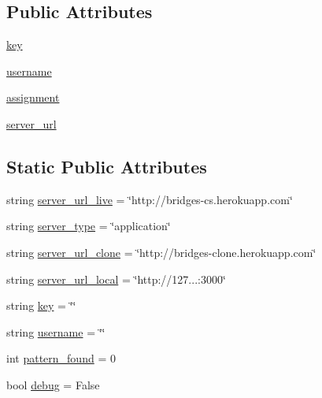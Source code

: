 \subsection*{Public Attributes}
\begin{DoxyCompactItemize}
\item 
\mbox{\hyperlink{classbridges_1_1connector_1_1_connector_afeae8bc992dfa4336a6cc766d8414e6f}{key}}
\item 
\mbox{\hyperlink{classbridges_1_1connector_1_1_connector_adeb8d1b493eae70c24127fb175e1bfe7}{username}}
\item 
\mbox{\hyperlink{classbridges_1_1connector_1_1_connector_a2df020c062b6224d4eeb2c5407c02656}{assignment}}
\item 
\mbox{\hyperlink{classbridges_1_1connector_1_1_connector_abcc06e345e43916cf975eb200187d911}{server\+\_\+url}}
\end{DoxyCompactItemize}
\subsection*{Static Public Attributes}
\begin{DoxyCompactItemize}
\item 
string \mbox{\hyperlink{classbridges_1_1connector_1_1_connector_a10c26bfaf2718f837e7bddfd7715b729}{server\+\_\+url\+\_\+live}} = \char`\"{}http\+://bridges-\/cs.\+herokuapp.\+com\char`\"{}
\item 
string \mbox{\hyperlink{classbridges_1_1connector_1_1_connector_ab5146d539819322f0b0e121a56356ba2}{server\+\_\+type}} = \char`\"{}application\char`\"{}
\item 
string \mbox{\hyperlink{classbridges_1_1connector_1_1_connector_a9048518314ac4902eda88f8457154b63}{server\+\_\+url\+\_\+clone}} = \char`\"{}http\+://bridges-\/clone.\+herokuapp.\+com\char`\"{}
\item 
string \mbox{\hyperlink{classbridges_1_1connector_1_1_connector_a7d58b50fbd7d10f805957ec620135ef7}{server\+\_\+url\+\_\+local}} = \char`\"{}http\+://127...\+:3000\char`\"{}
\item 
string \mbox{\hyperlink{classbridges_1_1connector_1_1_connector_a3b577c34402fea1910f56fd9cac51c07}{key}} = \char`\"{}\char`\"{}
\item 
string \mbox{\hyperlink{classbridges_1_1connector_1_1_connector_af2f4f996092cf63a5e7940ca93a2c6b7}{username}} = \char`\"{}\char`\"{}
\item 
int \mbox{\hyperlink{classbridges_1_1connector_1_1_connector_ad137981eae887e1f050216edb7670d35}{pattern\+\_\+found}} = 0
\item 
bool \mbox{\hyperlink{classbridges_1_1connector_1_1_connector_a05ea0150f79561e26b725654fe8ff7dc}{debug}} = False
\end{DoxyCompactItemize}


